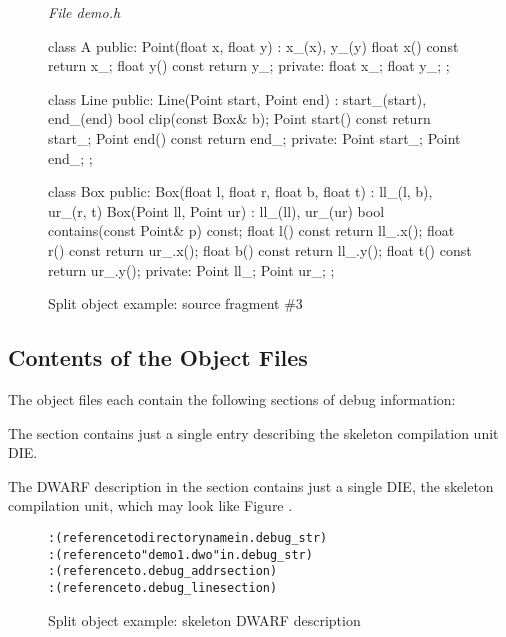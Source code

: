 \begin{figure}[ht]
\textit{File demo.h}
\begin{nlnlisting}
class A {
  public:
    Point(float x, float y) : x_(x), y_(y){}
    float x() const { return x_; }
    float y() const { return y_; }
  private:
    float x_;
    float y_;
};

class Line {
  public:
    Line(Point start, Point end) : start_(start), end_(end){}
    bool clip(const Box& b);
    Point start() const { return start_; }
    Point end() const { return end_; }
  private:
    Point start_;
    Point end_;
};

class Box {
  public:
    Box(float l, float r, float b, float t) : ll_(l, b), ur_(r, t){}
    Box(Point ll, Point ur) : ll_(ll), ur_(ur){}
    bool contains(const Point& p) const;
    float l() const { return ll_.x(); }
    float r() const { return ur_.x(); }
    float b() const { return ll_.y(); }
    float t() const { return ur_.y(); }
  private:
    Point ll_;
    Point ur_;
};

\end{nlnlisting}
\caption{Split object example: source fragment \#3}
\label{fig:splitobjectexamplesourcefragment3}
\end{figure}

\clearpage
\subsection{Contents of the Object Files}
The object files each contain the following sections of debug
information:
\begin{alltt}
  \dotdebugabbrev
  \dotdebuginfo
  \dotdebugline
  \dotdebugstr
  \dotdebugaddr
  \dotdebugnames
  \dotdebugaranges
\end{alltt}

The \dotdebugabbrev{} section contains just a single entry describing
the skeleton compilation unit DIE.

The DWARF description in the \dotdebuginfo{} section 
contains just a single DIE, the skeleton compilation unit, 
which may look like 
Figure .

\begin{figure}[ht]
\begin{dwflisting}
\begin{alltt}

    \DWTAGskeletonunit
        \DWATcompdir: (reference to directory name in .debug_str)
        \DWATdwoname: (reference to "demo1.dwo" in .debug_str)
        \DWATaddrbase: (reference to .debug_addr section)
        \DWATstmtlist: (reference to .debug_line section)
      
\end{alltt}
\end{dwflisting}
\caption{Split object example: skeleton DWARF description}
\label{fig:splitdwafexampleskeletondwarfdescription}
\end{figure}

